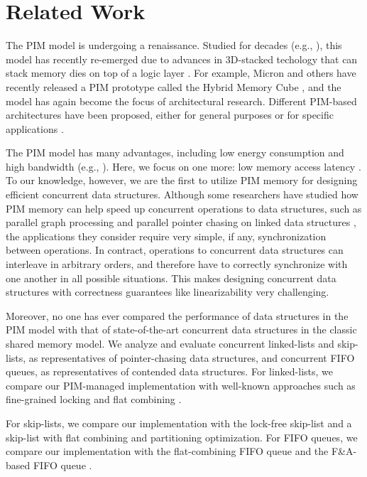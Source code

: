 \section{Related Work}
\label{section:related_work}
The PIM model is undergoing a renaissance. 
Studied for decades 
(e.g., \cite{Stone1970, Kogge1994, Gokhale1995, Patterson1997, Oskin1998, KangHYKGLTP99, Hall1999}), 
this model has recently re-emerged due to advances in 3D-stacked techology that 
can stack memory dies on top of a logic layer \cite{jeddeloh2012, Loh2008, Black2006}. 
For example, Micron and others have recently released a PIM prototype called 
the Hybrid Memory Cube \cite{website:HMC}, and the model has again become the focus of architectural research.
Different PIM-based architectures have been proposed, either for general purposes or for 
specific applications \cite{Ahn2015:1, Ahn2015:2, Zhang2014:TTP, hsieh2016accelerating,
Azarkhish16, Akin2015:DRM, Azarkhish2015, AzarkhishPRLB17, boroumand2016, ZhuASSHPF13, ZhuGSPF13}.

The PIM model has many advantages, including low energy consumption and high bandwidth 
(e.g., \cite{Ahn2015:2, Zhang2014:TTP, ZhuASSHPF13, AzarkhishPRLB17}). 
Here, we focus on one more: low memory access latency 
\cite{Loh2008, hsieh2016accelerating, Azarkhish16}.
To our knowledge, however, we are the first to utilize PIM memory for designing efficient 
concurrent data structures. 
Although some researchers have studied how PIM memory can help speed up concurrent 
operations to data structures, such as parallel graph processing \cite{Ahn2015:2} and  
parallel pointer chasing on linked data structures \cite{hsieh2016accelerating}, 
the applications they consider require very simple, if any, synchronization between operations. 
In contract, operations to concurrent data structures can interleave in arbitrary orders, 
and therefore have to correctly synchronize with one another in all possible situations. 
This makes designing concurrent data structures with correctness guarantees like 
linearizability \cite{Herlihy90} very challenging. 

Moreover, no one has ever compared the performance of data structures in the PIM model 
with that of state-of-the-art concurrent data structures in the classic shared memory model. 
We analyze and evaluate concurrent linked-lists and skip-lists, 
as representatives of pointer-chasing data structures, and concurrent FIFO queues, 
as representatives of contended data structures.
For linked-lists, we compare our PIM-managed implementation with well-known approaches 
such as fine-grained locking \cite{Heller05} and flat combining \cite{Hendler10}.

For skip-lists, we compare our implementation with the lock-free skip-list \cite{Herlihy08} 
and a skip-list with flat combining and partitioning optimization. 
For FIFO queues, we compare our implementation with the flat-combining FIFO queue 
\cite{Hendler10} and the F\&A-based FIFO queue \cite{Morrison13}. 